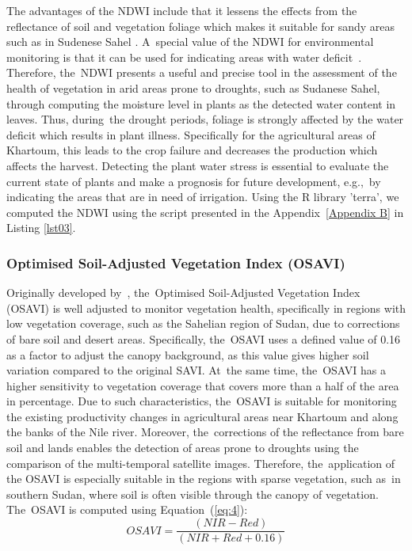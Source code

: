 \documentclass[jimaging,article,accept,pdftex,moreauthors]{Definitions/mdpi}
\begin{document}
The advantages of the NDWI include that it lessens the effects from the reflectance of soil and vegetation foliage which makes it suitable for sandy areas such as in Sudenese Sahel%
. A~special value of the NDWI for environmental monitoring is that it can be used for indicating areas with water deficit~\cite{TENG2021107260}. Therefore, the~NDWI presents a useful and precise tool in the assessment of the health of vegetation in arid areas prone to droughts, such as Sudanese Sahel, through computing the moisture level in plants as the detected water content in leaves. Thus, during~the drought periods, foliage is strongly affected by the water deficit which results in plant illness. Specifically for the agricultural areas of Khartoum, this leads to the crop failure and decreases the production which affects the harvest. Detecting the plant water stress is essential to evaluate the current state of plants and make a prognosis for future development, e.g.,~by indicating the areas that are in need of irrigation. Using the R library 'terra', we computed the NDWI using the script presented in the Appendix~\ref{Appendix B} in Listing \ref{lst03}.

\subsubsection{Optimised Soil-Adjusted Vegetation Index (OSAVI)}

Originally developed by~\cite{Rondeaux}, the~Optimised Soil-Adjusted Vegetation Index (OSAVI) is well adjusted to monitor vegetation health, specifically in regions with low vegetation coverage, such as the Sahelian region of Sudan, due to corrections of bare soil and desert areas. Specifically, the~OSAVI uses a defined value of 0.16 as a factor to adjust the canopy background, as this value gives higher soil variation compared to the original SAVI. At~the same time, the~OSAVI has a higher sensitivity to vegetation coverage that covers more than a half of the area in percentage. Due to such characteristics, the~OSAVI is suitable for monitoring the existing productivity changes in agricultural areas near Khartoum and along the banks of the Nile river. Moreover, the~corrections of the reflectance from bare soil and lands enables the detection of areas prone to droughts using the comparison of the multi-temporal satellite images. Therefore, the~application of the OSAVI is especially suitable in the regions with sparse vegetation, such as~in southern Sudan, where soil is often visible through the canopy of vegetation. The~OSAVI is computed using Equation~(\ref{eq:4}):
\begin{equation}\label{eq:4}
	OSAVI=\dfrac{(NIR-Red)}{(NIR+Red+0.16)}
\end{equation}
\end{document}
